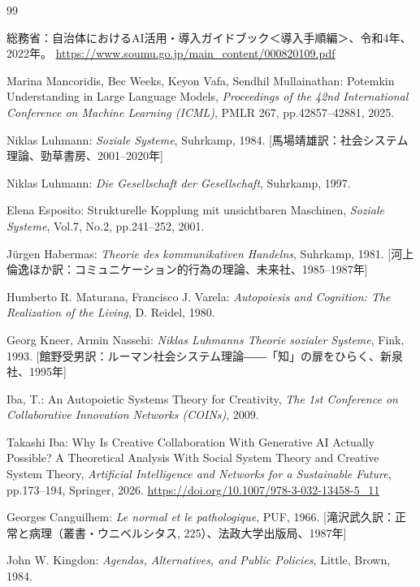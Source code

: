 \documentclass{keikaku}
\begin{document}
\begin{thebibliography}{99}

    総務省：自治体におけるAI活用・導入ガイドブック＜導入手順編＞、令和4年、2022年。
    \url{https://www.soumu.go.jp/main_content/000820109.pdf}

    Marina Mancoridis, Bec Weeks, Keyon Vafa, Sendhil Mullainathan: Potemkin Understanding in Large Language Models, \textit{Proceedings of the 42nd International Conference on Machine Learning (ICML)}, PMLR 267, pp.42857--42881, 2025.

    Niklas Luhmann: \textit{Soziale Systeme}, Suhrkamp, 1984. [馬場靖雄訳：社会システム理論、勁草書房、2001--2020年]

    Niklas Luhmann: \textit{Die Gesellschaft der Gesellschaft}, Suhrkamp, 1997.

    Elena Esposito: Strukturelle Kopplung mit unsichtbaren Maschinen, \textit{Soziale Systeme}, Vol.7, No.2, pp.241--252, 2001.

    Jürgen Habermas: \textit{Theorie des kommunikativen Handelns}, Suhrkamp, 1981. [河上倫逸ほか訳：コミュニケーション的行為の理論、未来社、1985--1987年]

    Humberto R. Maturana, Francisco J. Varela: \textit{Autopoiesis and Cognition: The Realization of the Living}, D. Reidel, 1980.

    Georg Kneer, Armin Nassehi: \textit{Niklas Luhmanns Theorie sozialer Systeme}, Fink, 1993. [館野受男訳：ルーマン社会システム理論――「知」の扉をひらく、新泉社、1995年]

    Iba, T.: An Autopoietic Systems Theory for Creativity, \textit{The 1st Conference on Collaborative Innovation Networks (COINs)}, 2009.

    Takashi Iba: Why Is Creative Collaboration With Generative AI Actually Possible? A Theoretical Analysis With Social System Theory and Creative System Theory, \textit{Artificial Intelligence and Networks for a Sustainable Future}, pp.173--194, Springer, 2026.
    \url{https://doi.org/10.1007/978-3-032-13458-5_11}

    Georges Canguilhem: \textit{Le normal et le pathologique}, PUF, 1966. [滝沢武久訳：正常と病理（叢書・ウニベルシタス, 225）、法政大学出版局、1987年]

    John W. Kingdon: \textit{Agendas, Alternatives, and Public Policies}, Little, Brown, 1984.


\end{thebibliography}
\end{document}
